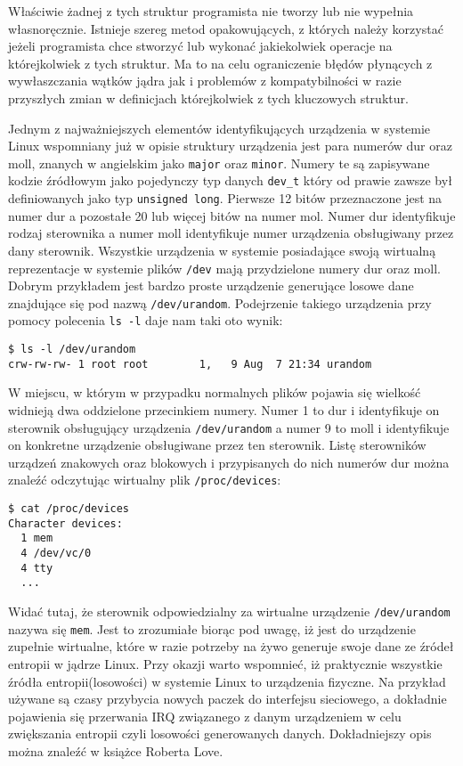 \documentclass[10pt]{scrartcl}
\begin{document}
Właściwie żadnej z tych struktur programista nie tworzy lub nie wypełnia własnoręcznie. Istnieje szereg metod opakowujących, z których należy korzystać jeżeli programista chce stworzyć lub wykonać jakiekolwiek operacje na którejkolwiek z tych struktur. Ma to na celu ograniczenie błędów płynących z wywłaszczania wątków jądra jak i problemów z kompatybilności w razie przyszłych zmian w definicjach którejkolwiek z tych kluczowych struktur.

Jednym z najważniejszych elementów identyfikujących urządzenia w systemie Linux wspomniany już w opisie struktury urządzenia jest para numerów dur oraz moll, znanych w angielskim jako \texttt{major} oraz \texttt{minor}. Numery te są zapisywane kodzie źródłowym jako pojedynczy typ danych \texttt{dev\_t} który od prawie zawsze był definiowanych jako typ \texttt{unsigned long}. Pierwsze 12 bitów przeznaczone jest na numer dur a pozostałe 20 lub więcej bitów na numer mol. Numer dur identyfikuje rodzaj sterownika a numer moll identyfikuje numer urządzenia obsługiwany przez dany sterownik. Wszystkie urządzenia w systemie posiadające swoją wirtualną reprezentacje w systemie plików \texttt{/dev} mają przydzielone numery dur oraz moll. Dobrym przykładem jest bardzo proste urządzenie generujące losowe dane znajdujące się pod nazwą \texttt{/dev/urandom}. Podejrzenie takiego urządzenia przy pomocy polecenia \texttt{ls -l} daje nam taki oto wynik:

\begin{verbatim}
$ ls -l /dev/urandom
crw-rw-rw- 1 root root        1,   9 Aug  7 21:34 urandom
\end{verbatim}

W miejscu, w którym w przypadku normalnych plików pojawia się wielkość widnieją dwa oddzielone przecinkiem numery. Numer 1 to dur i identyfikuje on sterownik obsługujący urządzenia \texttt{/dev/urandom} a numer 9 to moll i identyfikuje on konkretne urządzenie obsługiwane przez ten sterownik. Listę sterowników urządzeń znakowych oraz blokowych i przypisanych do nich numerów dur można znaleźć odczytując wirtualny plik \texttt{/proc/devices}:

\begin{verbatim}
$ cat /proc/devices
Character devices:
  1 mem
  4 /dev/vc/0
  4 tty
  ...
\end{verbatim}

Widać tutaj, że sterownik odpowiedzialny za wirtualne urządzenie \texttt{/dev/urandom} nazywa się \texttt{mem}. Jest to zrozumiałe biorąc pod uwagę, iż jest do urządzenie zupełnie wirtualne, które w razie potrzeby na żywo generuje swoje dane ze źródeł entropii w jądrze Linux.  Przy okazji warto wspomnieć, iż praktycznie wszystkie źródła entropii(losowości) w systemie Linux to urządzenia fizyczne. Na przykład używane są czasy przybycia nowych paczek do interfejsu sieciowego, a dokładnie pojawienia się przerwania IRQ związanego z danym urządzeniem w celu zwiększania entropii czyli losowości generowanych danych.  Dokładniejszy opis można znaleźć w książce Roberta Love\cite{linuxkerneldevel}.
\end{document}
